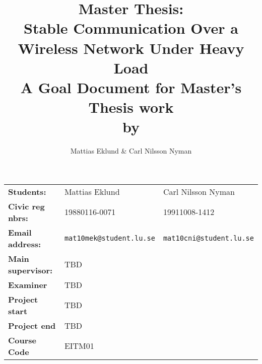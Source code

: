 \documentclass[a4paper]{article}
\title{Master Thesis:\\\Large{Stable Communication Over a Wireless Network Under
	Heavy Load}
\\\large{A Goal Document for Master's Thesis work\\by}}
\author{Mattias Eklund \& Carl Nilsson Nyman}
\date{}
\begin{document}
\maketitle
\thispagestyle{empty}

\pagebreak
\setcounter{page}{1}

\begin{tabular}{lll}
	\textbf{Students:} & Mattias Eklund & Carl Nilsson Nyman \\
	\textbf{Civic reg nbrs:} & 19880116-0071& 19911008-1412\\
	\textbf{Email address:} & \texttt{mat10mek@student.lu.se}
	& \texttt{mat10cni@student.lu.se} \\
	\textbf{Main supervisor:} & TBD & \\
	\textbf{Examiner} & TBD & \\
	\textbf{Project start} & TBD & \\
	\textbf{Project end} & TBD & \\
	\textbf{Course Code} & EITM01 & 
\end{tabular}

%
%
%
%
\end{document}
